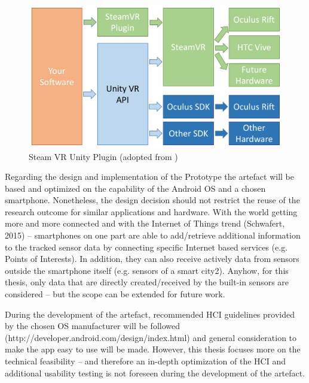 \begin{figure}[h]
	\begin{center}
		\includegraphics[width=14cm]{03_Figures/04_Valve/OpenVR_SteamVR.png}
		\caption[Steam VR Unity Plugin]{Steam VR Unity Plugin (adopted from \cite{Valve2016})}
		\label{fig:steamvr}
	\end{center}
\end{figure}



Regarding the design and implementation of the Prototype the artefact will be based and optimized on the capability of the Android OS and a chosen smartphone. Nonetheless, the design decision should not restrict the reuse of the research outcome for similar applications and hardware.
With the world getting more and more connected and with the Internet of Things trend (Schwafert, 2015) – smartphones on one part are able to add/retrieve additional information to the tracked sensor data by connecting specific Internet based services (e.g. Points of Interests). In addition, they can also receive actively data from sensors outside the smartphone itself (e.g. sensors of a smart city2). Anyhow, for this thesis, only data that are directly created/received by the built-in sensors are considered – but the scope can be extended for future work.


During the development of the artefact, recommended HCI guidelines provided by the chosen OS manufacturer will be followed (http://developer.android.com/design/index.html) and general consideration to make the app easy to use will be made. However, this thesis focuses more on the technical feasibility – and therefore an in-depth optimization of the HCI and additional usability testing is not foreseen during the development of the artefact.





